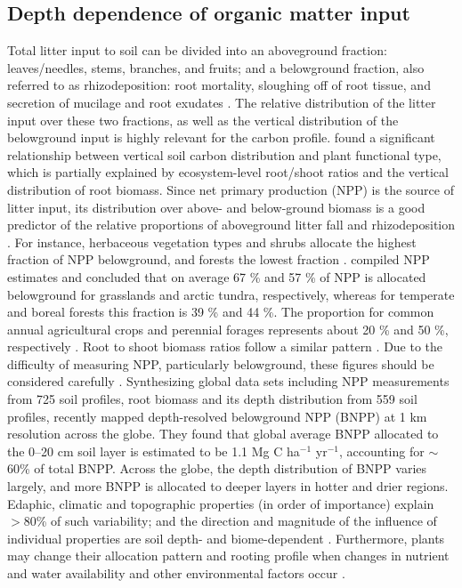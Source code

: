 \documentclass[11pt, oneside, a4paper]{article}   	%
\begin{document}
\subsection{Depth dependence of organic matter input}
Total litter input to soil can be divided into an aboveground fraction: leaves/needles, stems, branches,
and fruits; and a belowground fraction, also referred to as rhizodeposition: root
mortality, sloughing off of root tissue, and secretion of mucilage and root exudates
\citep{Nguyen2009}. The relative distribution of the litter input over these two fractions,
as well as the vertical distribution of the belowground input is highly relevant for the
carbon profile. \citet{Jobbagy2000} found a significant relationship between
vertical soil carbon distribution and plant functional type, which is partially explained by
ecosystem-level root/shoot ratios and the vertical distribution of root biomass.
Since net primary production (NPP) is the source of litter input, its distribution over above- and below-ground biomass is a good predictor of the relative proportions of aboveground litter
fall and rhizodeposition \citep{Raich1989, Xiao2023}. For instance, herbaceous vegetation types
and shrubs allocate the highest fraction of NPP belowground, and forests the lowest fraction \citep{Chapin2002}. \citet{Saugier2001} compiled NPP estimates and
concluded that on average 67 \% and 57 \% of NPP is allocated belowground for grasslands and arctic tundra, respectively, whereas for temperate and boreal forests this
fraction is 39 \% and 44 \%. 
The proportion for common annual agricultural crops and perennial forages represents about 20 \% and 50 \%, respectively \citep{Bolinder2007}.
Root to shoot biomass ratios follow a similar pattern \citep{Jackson1996}. Due to the difficulty of measuring NPP, particularly belowground,
these figures should be considered carefully \citep{Clark2001}. 
Synthesizing global data sets including NPP measurements from 725 soil profiles, root biomass and its depth distribution from 559 soil profiles, \citet{Xiao2023} recently mapped depth-resolved belowground NPP (BNPP) at 1 km resolution across the globe. They found that global average BNPP allocated to the 0–20 cm soil layer is estimated to be 1.1 Mg C ha$^{-1}$ yr$^{-1}$, accounting for $\sim$60\% of total BNPP. Across the globe, the depth distribution of BNPP varies largely, and more BNPP is allocated to deeper layers in hotter and drier regions. Edaphic, climatic and topographic properties (in order of importance) explain $>80$\% of such variability; and the direction and magnitude of the influence of individual properties are soil depth- and biome-dependent \citep{Xiao2023}. 
Furthermore,
plants may change their allocation pattern and rooting profile when changes in nutrient and water availability and other environmental factors occur \citep{Jackson2000}.
\end{document}
